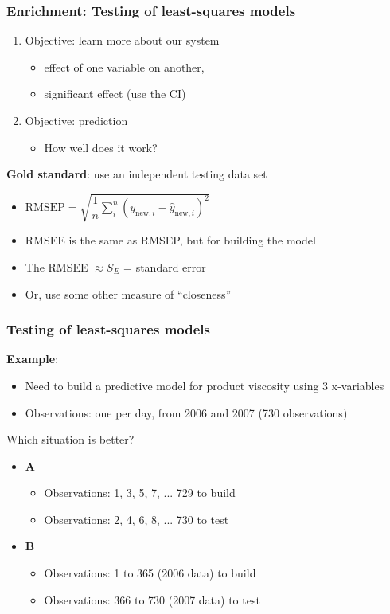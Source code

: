 \begin{frame}\frametitle{Enrichment: Testing of least-squares models}
	\begin{enumerate}
		\item	Objective: learn more about our system
		\begin{itemize}
			\item	effect of one variable on another,
			\item	significant effect (use the CI)
		\end{itemize}
		\item	Objective: prediction
		\begin{itemize}
			\item	How well does it work?
		\end{itemize}
	\end{enumerate}

	\textbf{Gold standard}: use an independent testing data set
	\begin{itemize}
		\item	$\text{RMSEP} = \sqrt{\dfrac{1}{n}\sum_{i}^{n}{\left(y_{\text{new}, i} - \hat{y}_{\text{new}, i}\right)^2}}$
		\item	RMSEE is the same as RMSEP, but for building the model
		\item	The RMSEE $\approx S_E$ = standard error
		\item	Or, use some other measure of ``closeness''
	\end{itemize}
\end{frame}

\begin{frame}\frametitle{Testing of least-squares models}

	\textbf{Example}:
	\begin{itemize}
		\item	Need to build a predictive model for product viscosity using 3 x-variables
		\item	Observations: one per day, from 2006 and 2007 (730 observations)
	\end{itemize}

	Which situation is better?
	\begin{itemize}
		\item	\textbf{A}
		\begin{itemize}
			\item	Observations: 1, 3, 5, 7, ... 729 to build
			\item	Observations: 2, 4, 6, 8, ... 730 to test
		\end{itemize}
		\item	\textbf{B}
		\begin{itemize}
			\item	Observations: 1 to 365 (2006 data) to build
			\item	Observations: 366 to 730 (2007 data) to test
		\end{itemize}
	\end{itemize}
\end{frame}

